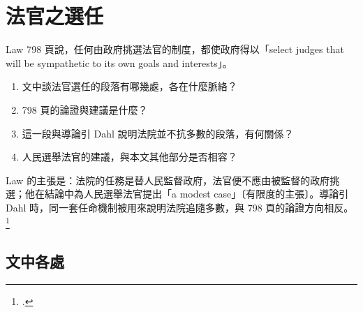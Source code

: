 \chapter{法官之選任}
\label{ch:40_selection}

\begin{qaquestion}
Law 798 頁說，任何由政府挑選法官的制度，都使政府得以「select judges that will be sympathetic to its own goals and interests」。
\begin{enumerate}
\tightlist
\item 文中談法官選任的段落有哪幾處，各在什麼脈絡？
\item 798 頁的論證與建議是什麼？
\item 這一段與導論引 Dahl 說明法院並不抗多數的段落，有何關係？
\item 人民選舉法官的建議，與本文其他部分是否相容？
\end{enumerate}
\end{qaquestion}

Law 的主張是：法院的任務是替人民監督政府，法官便不應由被監督的政府挑選；他在結論中為人民選舉法官提出「a modest case」〔有限度的主張〕。導論引 Dahl 時，同一套任命機制被用來說明法院追隨多數，與 798 頁的論證方向相反。\footcite[734]{law2009}

\section{文中各處}
\label{sec:40_selection-1}

